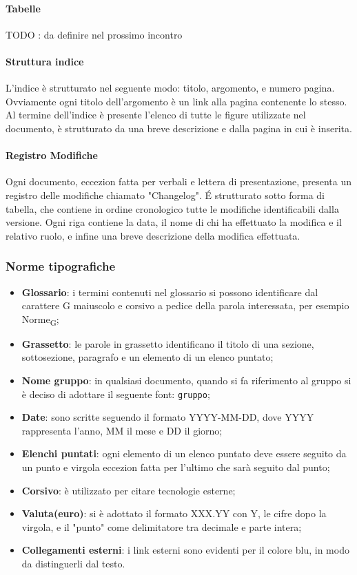 \paragraph{Tabelle\\}
TODO : da definire nel prossimo incontro

\paragraph{Struttura indice\\}
L'indice è strutturato nel seguente modo: titolo, argomento, e numero pagina. Ovviamente ogni titolo dell'argomento è un link alla pagina contenente lo stesso. Al termine dell'indice è presente l'elenco di tutte le figure utilizzate nel documento, è strutturato da una breve descrizione e dalla pagina in cui è inserita.

\paragraph{Registro Modifiche\\}
Ogni documento, eccezion fatta per verbali e lettera di presentazione, presenta un registro delle modifiche chiamato "Changelog". \'E strutturato sotto forma di tabella, che contiene in ordine cronologico tutte le modifiche identificabili dalla versione.  Ogni riga contiene la data, il nome di chi ha effettuato la modifica e il relativo ruolo, e infine una breve descrizione della modifica effettuata.

\subsubsection{Norme tipografiche}
\begin{itemize}
	\item \textbf{Glossario}: i termini contenuti nel glossario si possono identificare dal carattere G maiuscolo e corsivo a pedice della parola interessata, per esempio Norme\textsubscript{G};
	\item \textbf{Grassetto}: le parole in grassetto identificano il titolo di una sezione, sottosezione, paragrafo e un elemento di un elenco puntato;
	\item \textbf{Nome gruppo}: in qualsiasi documento, quando si fa riferimento al gruppo si è deciso di adottare il seguente font: \texttt{gruppo};
	\item \textbf{Date}: sono scritte seguendo il formato YYYY-MM-DD, dove YYYY rappresenta l'anno, MM il mese e DD il giorno;
	\item \textbf{Elenchi puntati}: ogni elemento di un elenco puntato deve essere seguito da un punto e virgola eccezion fatta per l'ultimo che sarà seguito dal punto;
	\item \textbf{Corsivo}: è utilizzato per citare tecnologie esterne;
	\item \textbf{Valuta(euro)}: si è adottato il formato XXX.YY con Y, le cifre dopo la virgola, e il "punto" come delimitatore tra decimale e parte intera;
 	\item \textbf{Collegamenti esterni}: i link esterni sono evidenti per il colore blu, in modo da distinguerli dal testo.
\end{itemize}


